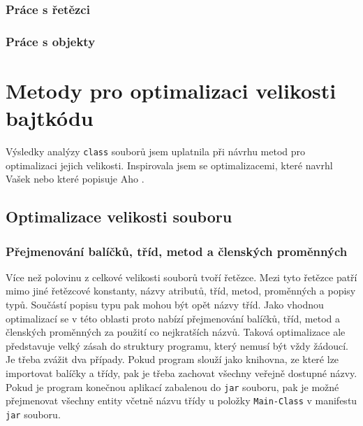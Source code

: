 \subsubsection{Práce s řetězci}


\subsubsection{Práce s objekty}

\section{Metody pro optimalizaci velikosti bajtkódu}\label{Analysis}

Výsledky analýzy \texttt{class} souborů jsem uplatnila při návrhu metod pro optimalizaci jejich velikosti. Inspirovala jsem se optimalizacemi, které navrhl Vašek \cite{TODO} nebo které popisuje Aho \cite{TODO}.

\subsection{Optimalizace velikosti souboru}

\subsubsection{Přejmenování balíčků, tříd, metod a členských proměnných}
Více než polovinu z celkové velikosti souborů tvoří řetězce. Mezi tyto řetězce patří mimo jiné řetězcové konstanty, názvy atributů, tříd, metod, proměnných a popisy typů. Součástí popisu typu pak mohou být opět názvy tříd. Jako vhodnou optimalizací se v této oblasti proto nabízí přejmenování balíčků, tříd, metod a členských proměnných za použití co nejkratších názvů. Taková optimalizace ale představuje velký zásah do struktury programu, který nemusí být vždy žádoucí. Je třeba zvážit dva případy. Pokud program slouží jako knihovna, ze které lze importovat balíčky a třídy, pak je třeba zachovat všechny veřejně dostupné názvy. Pokud je program konečnou aplikací zabalenou do \texttt{jar} souboru, pak je možné přejmenovat všechny entity včetně názvu třídy u položky \texttt{Main-Class} v manifestu \texttt{jar} souboru.

